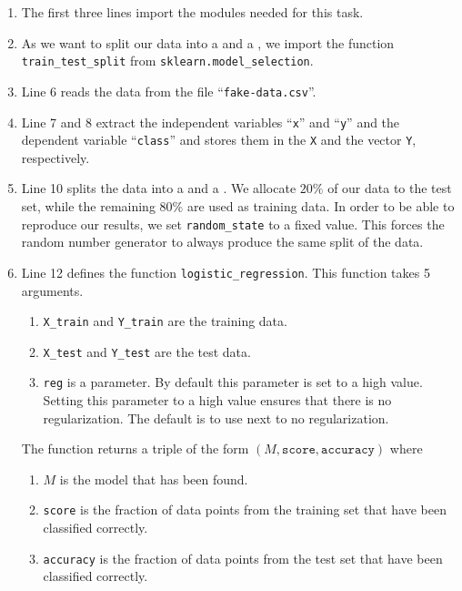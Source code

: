 \begin{enumerate}
\item The first three lines import the modules needed for this task.
\item As we want to split our data into a  and a , we import the function
      \texttt{train\_test\_split} from \texttt{sklearn.model\_selection}.
\item Line 6 reads the data from the file ``\texttt{fake-data.csv}''.
\item Line 7 and 8 extract the independent variables ``\texttt{x}'' and ``\texttt{y}'' and the dependent
      variable ``\texttt{class}'' and stores them in the  \texttt{X} and the vector
      \texttt{Y}, respectively.
\item Line 10 splits the data into a  and a .  We allocate $20\%$ of our data
      to the test set, while the remaining $80\%$ are used as training data.
      In order to be able to reproduce our results, we set \texttt{random\_state} to a fixed value.
      This forces the random number generator to always produce the same split of the data.
\item Line 12 defines the function \texttt{logistic\_regression}.  This function takes 5 arguments.
      \begin{enumerate}
      \item \texttt{X\_train} and \texttt{Y\_train} are the training data.
      \item \texttt{X\_test} and \texttt{Y\_test} are the test data.
      \item \texttt{reg} is a  parameter.  By default this parameter is set to a high
            value.  Setting this parameter to a high value ensures that there is no regularization.
            The default is to use next to no regularization.
      \end{enumerate}
      The function returns a triple of the form $(M, \mathtt{score}, \mathtt{accuracy})$ where
      \begin{enumerate}
      \item $M$ is the model that has been found.
      \item \texttt{score} is the fraction of data points from the training set that have been
            classified correctly.
      \item \texttt{accuracy} is the fraction of data points from the test set that have been
            classified correctly.
      \end{enumerate}

\end{enumerate}
